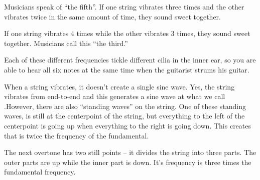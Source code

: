 Musicians speak of ``the fifth''.  If one string vibrates three times
and the other vibrates twice in the same amount of time, they sound
sweet together.

If one string vibrates 4 times while the other vibrates 3 times, they
sound sweet together. Musicians call this ``the third.''

Each of these different frequencies tickle different cilia in the
inner ear, so you are able to hear all six notes at the same time when
the guitarist strums his guitar.

When a string vibrates, it doesn't create a single sine wave. Yes, the
string vibrates from end-to-end and this generates a sine wave at what
we call .However, there are also
``standing waves'' on the string. One of these standing waves, is
still at the centerpoint of the string, but everything to the left of
the centerpoint is going up when everything to the right is going
down. This creates  that is twice the frequency
of the fundamental.


The next overtone has two still points -- it divides the string into
three parts.  The outer parts are up while the inner part is
down. It's frequency is three times the fundamental frequency.


